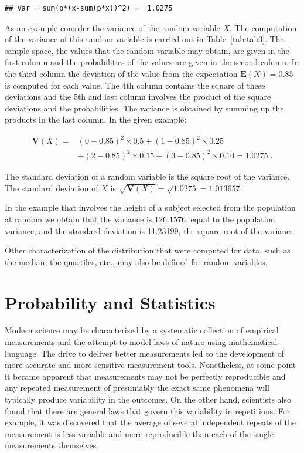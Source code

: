 \documentclass[]{krantz}
\newcommand{\Expec}{\mathbf{E}}
\newcommand{\Var}{\mathbf{V}}
\theoremstyle{definition}
\theoremstyle{definition}
\theoremstyle{definition}
\theoremstyle{remark}
\begin{document}
\begin{verbatim}
## Var = sum(p*(x-sum(p*x))^2) =  1.0275
\end{verbatim}

As an example consider the variance of the random variable \(X\). The
computation of the variance of this random variable is carried out in
Table~\ref{tab:tab3}. The sample space, the values that the
random variable may obtain, are given in the first column and the
probabilities of the values are given in the second column. In the third
column the deviation of the value from the expectation
\(\Expec(X) = 0.85\) is computed for each value. The 4th column contains
the square of these deviations and the 5th and last column involves the
product of the square deviations and the probabilities. The variance is
obtained by summing up the products in the last column. In the given
example:

\[\begin{aligned}
\Var(X) = & (0-0.85)^2 \times 0.5  + (1-0.85)^2 \times 0.25 \\ &+ (2-0.85)^2\times 0.15 + (3-0.85)^2\times 0.10= 1.0275\;.\end{aligned}\]

The standard deviation of a random variable is the square root of the
variance. The standard deviation of \(X\) is
\(\sqrt{\Var(X)} = \sqrt{1.0275} = 1.013657\).

In the example that involves the height of a subject selected from the
population at random we obtain that the variance is \(126.1576\), equal to
the population variance, and the standard deviation is 11.23199, the
square root of the variance.

Other characterization of the distribution that were computed for data,
such as the median, the quartiles, etc., may also be defined for random
variables.

\hypertarget{probability-and-statistics}{%
\section{Probability and Statistics}\label{probability-and-statistics}}

Modern science may be characterized by a systematic collection of
empirical measurements and the attempt to model laws of nature using
mathematical language. The drive to deliver better measurements led to
the development of more accurate and more sensitive measurement tools.
Nonetheless, at some point it became apparent that measurements may not
be perfectly reproducible and any repeated measurement of presumably the
exact same phenomena will typically produce variability in the outcomes.
On the other hand, scientists also found that there are general laws
that govern this variability in repetitions. For example, it was
discovered that the average of several independent repeats of the
measurement is less variable and more reproducible than each of the
single measurements themselves.
\end{document}
